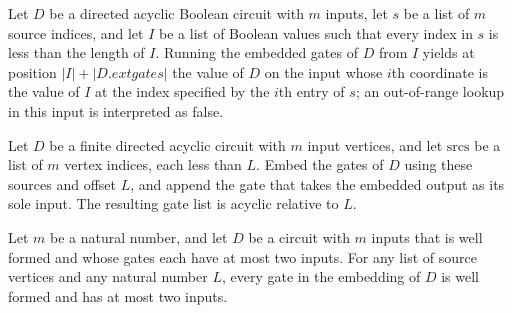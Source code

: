 \begin{theorem}
\label{BoolCircuit.runWith_embedGates_getD}
\leanok
{}
Let $D$ be a directed acyclic Boolean circuit with $m$ inputs, let $s$ be a list of $m$
source indices, and let $I$ be a list of Boolean values such that every index in $s$ is
less than the length of $I$. Running the embedded gates of $D$ from $I$ yields at
position $|I|+|D.	ext{gates}|$ the value of $D$ on the input whose $i$th coordinate is
the value of $I$ at the index specified by the $i$th entry of $s$; an out-of-range
lookup in this input is interpreted as false.
\end{theorem}

\begin{theorem}
\label{BoolCircuit.gatesAcyclic_embedGates}
\leanok
{}
Let $D$ be a finite directed acyclic circuit with $m$ input vertices, and let
$\mathrm{srcs}$ be a list of $m$ vertex indices, each less than $L$. Embed the gates of
$D$ using these sources and offset $L$, and append the gate that takes the embedded
output as its sole input. The resulting gate list is acyclic relative to $L$.
\end{theorem}

\begin{theorem}
\label{BoolCircuit.faninTwo_embedGates}
\leanok
{}
Let $m$ be a natural number, and let $D$ be a circuit with $m$ inputs that is well
formed and whose gates each have at most two inputs. For any list of source vertices and
any natural number $L$, every gate in the embedding of $D$ is well formed and has at
most two inputs.
\end{theorem}

